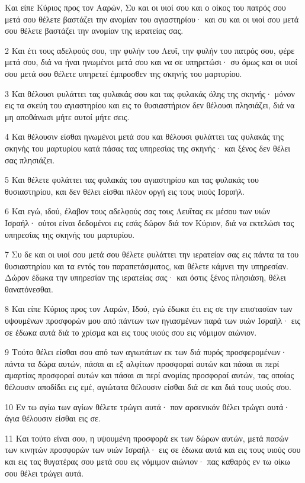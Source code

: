 \par Και είπε Κύριος προς τον Ααρών, Συ και οι υιοί σου και ο οίκος του πατρός σου μετά σου θέλετε βαστάζει την ανομίαν του αγιαστηρίου· και συ και οι υιοί σου μετά σου θέλετε βαστάζει την ανομίαν της ιερατείας σας.
\par 2 Και έτι τους αδελφούς σου, την φυλήν του Λευΐ, την φυλήν του πατρός σου, φέρε μετά σου, διά να ήναι ηνωμένοι μετά σου και να σε υπηρετώσι· συ όμως και οι υιοί σου μετά σου θέλετε υπηρετεί έμπροσθεν της σκηνής του μαρτυρίου.
\par 3 Και θέλουσι φυλάττει τας φυλακάς σου και τας φυλακάς όλης της σκηνής· μόνον εις τα σκεύη του αγιαστηρίου και εις το θυσιαστήριον δεν θέλουσι πλησιάζει, διά να μη αποθάνωσι μήτε αυτοί μήτε σεις.
\par 4 Και θέλουσιν είσθαι ηνωμένοι μετά σου και θέλουσι φυλάττει τας φυλακάς της σκηνής του μαρτυρίου κατά πάσας τας υπηρεσίας της σκηνής· και ξένος δεν θέλει σας πλησιάζει.
\par 5 Και θέλετε φυλάττει τας φυλακάς του αγιαστηρίου και τας φυλακάς του θυσιαστηρίου, και δεν θέλει είσθαι πλέον οργή εις τους υιούς Ισραήλ.
\par 6 Και εγώ, ιδού, έλαβον τους αδελφούς σας τους Λευΐτας εκ μέσου των υιών Ισραήλ· ούτοι είναι δεδομένοι εις εσάς δώρον διά τον Κύριον, διά να εκτελώσι τας υπηρεσίας της σκηνής του μαρτυρίου.
\par 7 Συ δε και οι υιοί σου μετά σου θέλετε φυλάττει την ιερατείαν σας εις πάντα τα του θυσιαστηρίου και τα εντός του παραπετάσματος, και θέλετε κάμνει την υπηρεσίαν. Δώρον έδωκα την υπηρεσίαν της ιερατείας σας· και όστις ξένος πλησιάση, θέλει θανατόνεσθαι.
\par 8 Και είπε Κύριος προς τον Ααρών, Ιδού, εγώ έδωκα έτι εις σε την επιστασίαν των υψουμένων προσφορών μου από πάντων των ηγιασμένων παρά των υιών Ισραήλ· εις σε έδωκα αυτά διά το χρίσμα και εις τους υιούς σου εις νόμιμον αιώνιον.
\par 9 Τούτο θέλει είσθαι σου από των αγιωτάτων εκ των διά πυρός προσφερομένων· πάντα τα δώρα αυτών, πάσαι αι εξ αλφίτων προσφοραί αυτών και πάσαι αι περί αμαρτίας προσφοραί αυτών και πάσαι αι περί ανομίας προσφοραί αυτών, τας οποίας θέλουσιν αποδίδει εις εμέ, αγιώτατα θέλουσιν είσθαι διά σε και διά τους υιούς σου.
\par 10 Εν τω αγίω των αγίων θέλετε τρώγει αυτά· παν αρσενικόν θέλει τρώγει αυτά· άγια θέλουσιν είσθαι εις σε.
\par 11 Και τούτο είναι σου, η υψουμένη προσφορά εκ των δώρων αυτών, μετά πασών των κινητών προσφορών των υιών Ισραήλ· εις σε έδωκα αυτά και εις τους υιούς σου και εις τας θυγατέρας σου μετά σου εις νόμιμον αιώνιον· πας καθαρός εν τω οίκω σου θέλει τρώγει αυτά.
